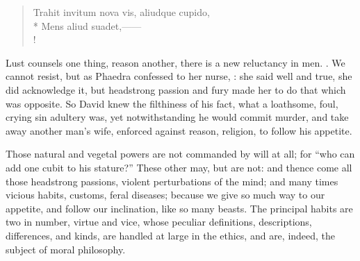 \begin{latin}
\begin{verse}
Trahit invitum nova vis, aliudque cupido,\\*
Mens aliud suadet,------\\!
\end{verse}
\end{latin}

Lust counsels one thing, reason another, there is a new reluctancy in men.
. We
cannot resist, but as Phaedra confessed to her nurse,
: she said well and true, she did acknowledge it, but headstrong passion
and fury made her to do that which was opposite. So David knew the filthiness
of his fact, what a loathsome, foul, crying sin adultery was, yet
notwithstanding he would commit murder, and take away another man's wife,
enforced against reason, religion, to follow his appetite.

Those natural and vegetal powers are not commanded by will at all; for \enquote{who can
add one cubit to his stature?} These other may, but are not: and thence come
all those headstrong passions, violent perturbations of the mind; and many
times vicious habits, customs, feral diseases; because we give so much way to
our appetite, and follow our inclination, like so many beasts. The principal
habits are two in number, virtue and vice, whose peculiar definitions,
descriptions, differences, and kinds, are handled at large in the ethics, and
are, indeed, the subject of moral philosophy.

